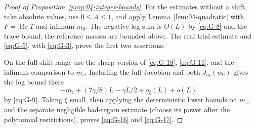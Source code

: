 \begin{proof}[Proof of Proposition~\ref{prop:04-integer-bounds}]
For the estimates without a shift, take absolute values, use \(0\le A\le1\),
and apply Lemma~\ref{lem:04-quadratic} with \(F=\operatorname{Re}T\)
and infimum \(m_0\). The negative log sum is \(O(L)\) by
\eqref{eq:G-8} and the trace bound; the reference masses are bounded
above. The real trial estimate and \eqref{eq:G-5}, with
\eqref{eq:G-3}, prove the first two assertions.

On the full-shift range use the sharp version of \eqref{eq:G-18}, \eqref{eq:G-11}, and the infimum comparison to \(m_z\). Including the full Jacobian and both \(J_{\nu_\sigma}(w_0)\) gives the log bound there
\[
 -m_z+(7\gamma/8)L-\gamma L/2+o_\xi(L)+o(L)
\]
by \eqref{eq:G-9}. Taking \(\xi\) small, then applying the deterministic lower bounds on \(m_z\), and the separate negligible bad-region estimate (choose its power after the polynomial restrictions), proves \eqref{eq:G-16} and \eqref{eq:G-17}.
\end{proof}

